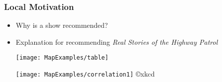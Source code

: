 \documentclass{beamer}
\begin{document}
\begin{frame}[plain]\frametitle{Local Motivation}

\begin{itemize}
\item Why is a show recommended?

\item Explanation for recommending {\small \em Real Stories of the Highway Patrol}

\texttt{[image: MapExamples/table]}\pause

\texttt{[image: MapExamples/correlation1]} \copyright xkcd


\end{itemize}
\end{frame}
\end{document}
